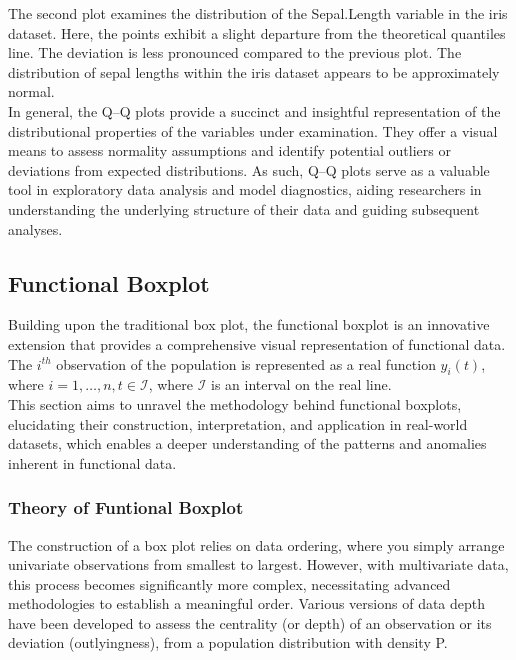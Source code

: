 \documentclass{article}\usepackage[]{graphicx}\usepackage[]{xcolor}
\numberwithin{equation}{section}
\begin{document}
\noindent The second plot examines the distribution of the Sepal.Length variable in the iris dataset. Here, the points exhibit a slight departure from the theoretical quantiles line. The deviation is less pronounced compared to the previous plot. The distribution of sepal lengths within the iris dataset appears to be approximately normal.\\

\noindent In general, the Q–Q plots provide a succinct and insightful representation of the distributional properties of the variables under examination. They offer a visual means to assess normality assumptions and identify potential outliers or deviations from expected distributions. As such, Q–Q plots serve as a valuable tool in exploratory data analysis and model diagnostics, aiding researchers in understanding the underlying structure of their data and guiding subsequent analyses.

\subsection{Functional Boxplot}

\noindent
Building upon the traditional box plot, the functional boxplot is an innovative extension that provides a comprehensive visual representation of functional data. The $i^{th}$ observation of the population is represented as a real function $y_i(t)$, where $i = 1, \dots , n, t \in \mathcal{I}$, where $\mathcal{I}$ is an interval on the real line.\\

\noindent
This section aims to unravel the methodology behind functional boxplots, elucidating their construction, interpretation, and application in real-world datasets, which enables a deeper understanding of the patterns and anomalies inherent in functional data.

\subsubsection{Theory of Funtional Boxplot}

The construction of a box plot relies on data ordering, where you simply arrange univariate observations from smallest to largest. However, with multivariate data, this process becomes significantly more complex, necessitating advanced methodologies to establish a meaningful order. Various versions of data depth have been developed to assess the centrality (or depth) of an observation or its deviation (outlyingness), from a population distribution with density P.\\
\end{document}
